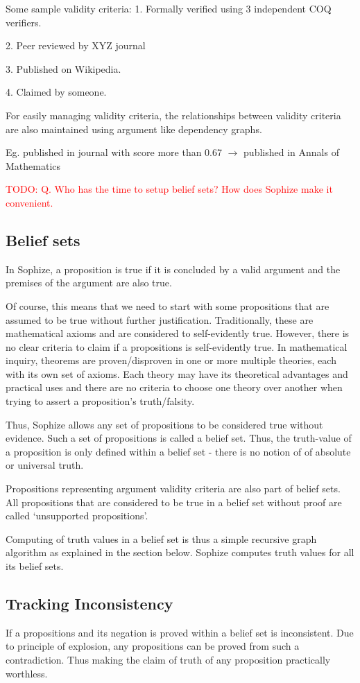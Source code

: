 \documentclass[a4paper]{article}
\newcommand\todo[1]{\textcolor{red}{TODO: #1}}
\begin{document}
Some sample validity criteria:
1. Formally verified using 3 independent COQ verifiers.

2. Peer reviewed by XYZ journal

3. Published on Wikipedia.

4. Claimed by someone.

For easily managing validity criteria, the relationships between validity criteria are also maintained using argument like dependency graphs.

Eg. published in journal with score more than 0.67 $\rightarrow$ published in Annals of Mathematics


\todo{Q. Who has the time to setup belief sets? How does Sophize make it 
convenient.}


\subsection{Belief sets}

In Sophize, a proposition is true if it is concluded by a valid argument and the premises of the argument are also true.

Of course, this means that we need to start with some propositions that are assumed to be true without further justification. Traditionally, these are mathematical axioms and are considered to self-evidently true. However, there is no clear criteria to claim if a propositions is self-evidently true. In mathematical inquiry, theorems are proven/disproven in one or more multiple theories, each with its own set of axioms. Each theory may have its theoretical advantages and practical uses and there are no criteria to choose one theory over another when trying to assert a proposition's truth/falsity.

Thus, Sophize allows any set of propositions to be considered true without evidence. Such a set of propositions is called a belief set. Thus, the truth-value of a proposition is only defined within a belief set - there is no notion of of absolute or universal truth. 

Propositions representing argument validity criteria are also part of belief sets. All propositions that are considered to be true in a belief set without proof are called `unsupported propositions'.

Computing of truth values in a belief set is thus a simple recursive graph algorithm as explained in the section below. Sophize computes truth values for all its belief sets.

\subsection{Tracking Inconsistency}
If a propositions and its negation is proved within a belief set is inconsistent. Due to principle of explosion, any propositions can be proved from such a contradiction. Thus making the claim of truth of any proposition practically worthless.
\end{document}
